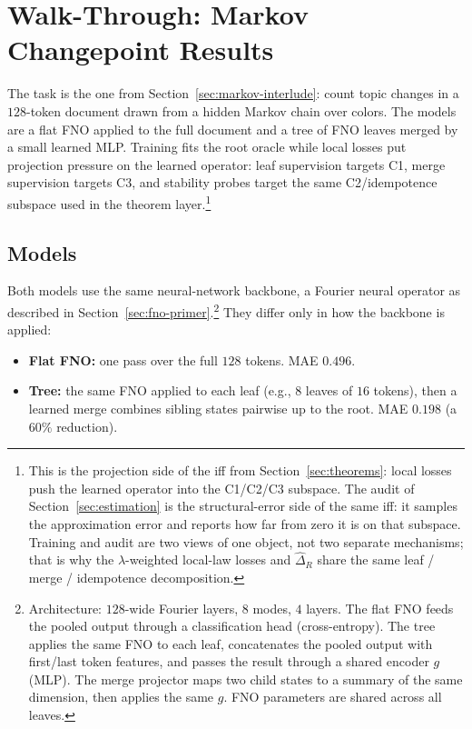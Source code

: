 \section{Walk-Through: Markov Changepoint Results}\label{sec:markov-walkthrough}

The task is the one from Section~\ref{sec:markov-interlude}: count topic changes in a $128$-token document drawn from a hidden Markov chain over colors. The models are a flat FNO applied to the full document and a tree of FNO leaves merged by a small learned MLP. Training fits the root oracle while local losses put projection pressure on the learned operator: leaf supervision targets C1, merge supervision targets C3, and stability probes target the same C2/idempotence subspace used in the theorem layer.\footnote{This is the projection side of the iff from Section~\ref{sec:theorems}: local losses push the learned operator into the C1/C2/C3 subspace. The audit of Section~\ref{sec:estimation} is the structural-error side of the same iff: it samples the approximation error and reports how far from zero it is on that subspace. Training and audit are two views of one object, not two separate mechanisms; that is why the $\lambda$-weighted local-law losses and $\hat\Delta_R$ share the same leaf / merge / idempotence decomposition.}

\subsection{Models}\label{sec:fno-baseline}

Both models use the same neural-network backbone, a Fourier neural
operator as described in Section~\ref{sec:fno-primer}.\footnote{Architecture: $128$-wide Fourier layers, $8$ modes, $4$ layers. The flat FNO feeds the pooled output through a classification head (cross-entropy). The tree applies the same FNO to each leaf, concatenates the pooled output with first/last token features, and passes the result through a shared encoder $g$ (MLP). The merge projector maps two child states to a summary of the same dimension, then applies the same $g$. FNO parameters are shared across all leaves.} They differ only in how the backbone is applied:

\begin{itemize}[leftmargin=1.5em]
    \item \textbf{Flat FNO:} one pass over the full $128$ tokens. MAE $0.496$.
    \item \textbf{Tree:} the same FNO applied to each leaf (e.g., $8$ leaves of $16$ tokens), then a learned merge combines sibling states pairwise up to the root. MAE $0.198$ (a $60\%$ reduction).
\end{itemize}

